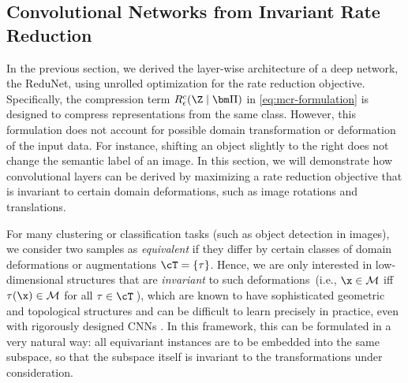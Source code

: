 \documentclass[../../book-main.tex]{subfiles}
\begin{document}
\subsection{Convolutional Networks from Invariant Rate
Reduction}\label{sec:shift-invariant}

In the previous section, we derived the layer-wise architecture of a
deep network, the ReduNet, using unrolled optimization for the rate
reduction objective.
Specifically, the compression term $R^c_\epsilon(\Z \mid\bm \Pi)$ in
\eqref{eq:mcr-formulation} is designed to compress representations
from the same class. However, this formulation does not account for
possible domain transformation or deformation of the input data. For
instance, shifting an object slightly to the right does not change
the semantic label of an image.  In this section, we will demonstrate
how convolutional layers can be derived by maximizing a rate
reduction objective that is invariant to certain domain deformations,
such as image rotations and translations.

For many clustering or classification tasks (such as object detection
in images), we consider two samples as {\em equivalent} if they
differ by certain classes of domain deformations or augmentations
$\cT = \{\tau \}$. Hence, we are only interested in low-dimensional
structures that are {\em invariant} to such deformations~(i.e., $\x
\in \mathcal{M}$ iff $\tau(\x) \in \mathcal{M}$ for all $\tau \in \cT$\,),
which are known to have sophisticated geometric and topological
structures and can be difficult to learn precisely in practice, even
with rigorously designed CNNs \cite{Cohen-ICML-2016}.
In this framework, this can be formulated in a very natural way: all
equivariant instances are to be embedded into the same subspace, so
that the subspace itself is invariant to the transformations under
consideration.
\end{document}
